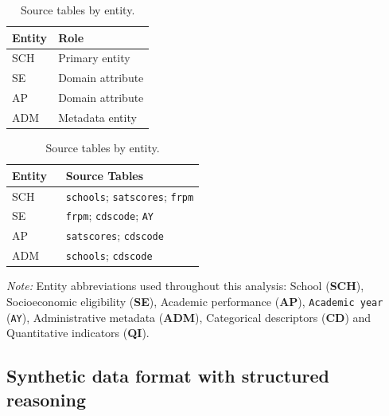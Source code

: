 \documentclass[letterpaper,journal]{IEEEtran}
\begin{document}
\begin{table}[!ht]
\centering
\footnotesize
\setlength{\tabcolsep}{3pt}

\begin{minipage}[t]{0.30\textwidth}
    \centering
    \caption{Entity functional roles.}
    \label{tab:er-core}
    \begin{tabular}{@{}ll@{}}
        \toprule
        \textbf{Entity} & \textbf{Role} \\
        \midrule
        SCH & Primary entity \\
        SE  & Domain attribute \\
        AP  & Domain attribute \\
        ADM & Metadata entity \\
        \bottomrule
    \end{tabular}
\end{minipage}
\hfill
\begin{minipage}[t]{0.35\textwidth}
    \centering
    \caption{Source tables by entity.}
    \label{tab:er-sources}
    \begin{tabular}{@{}lp{0.72\linewidth}@{}}
        \toprule
        \textbf{Entity} & \textbf{Source Tables} \\
        \midrule
        SCH & \texttt{schools}; \texttt{satscores}; \texttt{frpm} \\
        SE  & \texttt{frpm}; \texttt{cdscode}; \texttt{AY} \\
        AP  & \texttt{satscores}; \texttt{cdscode} \\
        ADM & \texttt{schools}; \texttt{cdscode} \\
        \bottomrule
    \end{tabular}
\end{minipage}

\begin{minipage}{0.9\textwidth}
\footnotesize
\vspace{1mm}
\textit{Note:} 
\noindent Entity abbreviations used throughout this analysis: School (\textbf{SCH}), Socioeconomic eligibility (\textbf{SE}), Academic performance (\textbf{AP}), \texttt{Academic year} (\texttt{AY}), Administrative metadata (\textbf{ADM}), Categorical descriptors (\textbf{CD}) and Quantitative indicators (\textbf{QI}).
\end{minipage}
\end{table}


\clearpage
\subsection{Synthetic data format with structured reasoning}
\label{app:training_format}
\end{document}
